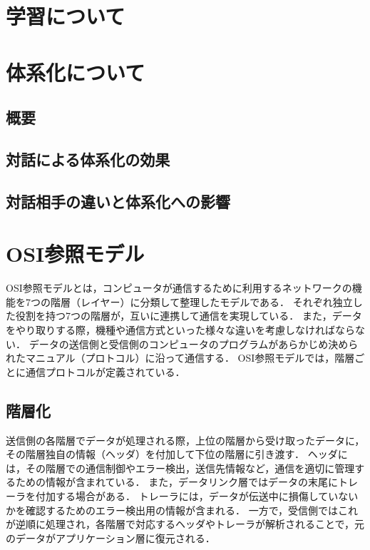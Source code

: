 \documentclass[12pt,a4j,titlepage]{ltjsarticle}
\begin{document}


\clearpage

\section{学習について}\label{学習について}


\section{体系化について}
\subsection{概要}

\subsection{対話による体系化の効果}

\subsection{対話相手の違いと体系化への影響}

\section{OSI参照モデル}
OSI参照モデルとは，コンピュータが通信するために利用するネットワークの機能を7つの階層（レイヤー）に分類して整理したモデルである．
それぞれ独立した役割を持つ7つの階層が，互いに連携して通信を実現している．
また，データをやり取りする際，機種や通信方式といった様々な違いを考慮しなければならない．
データの送信側と受信側のコンピュータのプログラムがあらかじめ決められたマニュアル（プロトコル）に沿って通信する．
OSI参照モデルでは，階層ごとに通信プロトコルが定義されている．

\subsection{階層化}
送信側の各階層でデータが処理される際，上位の階層から受け取ったデータに，その階層独自の情報（ヘッダ）を付加して下位の階層に引き渡す．
ヘッダには，その階層での通信制御やエラー検出，送信先情報など，通信を適切に管理するための情報が含まれている．
また，データリンク層ではデータの末尾にトレーラを付加する場合がある．
トレーラには，データが伝送中に損傷していないかを確認するためのエラー検出用の情報が含まれる．
一方で，受信側ではこれが逆順に処理され，各階層で対応するヘッダやトレーラが解析されることで，元のデータがアプリケーション層に復元される．
\end{document}
